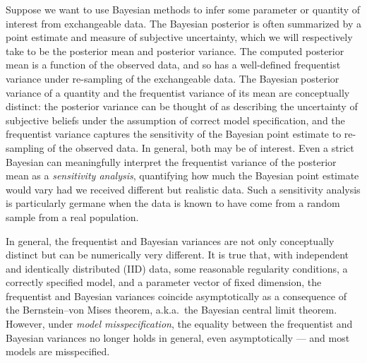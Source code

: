 
Suppose we want to use Bayesian methods to infer some parameter or quantity of
interest from exchangeable data. The Bayesian posterior is often summarized by a
point estimate and measure of subjective uncertainty, which we will respectively
take to be the posterior mean and posterior variance.  The computed posterior
mean is a function of the observed data, and so has a well-defined frequentist
variance under re-sampling of the exchangeable data.  The Bayesian posterior
variance of a quantity and the frequentist variance of its mean are conceptually
distinct: the posterior variance can be thought of as describing the
uncertainty of subjective beliefs under the assumption of correct model
specification, and the frequentist variance captures the sensitivity of the
Bayesian point estimate to re-sampling of the observed data.  In general,
both may be of interest.
Even a strict Bayesian can meaningfully interpret the
frequentist variance of the posterior mean as a \emph{sensitivity analysis},
quantifying how much the Bayesian point estimate would vary had we received
different but realistic data.  Such a sensitivity analysis is particularly
germane when the data is known to have come from a random sample from a real
population. 


In general, the frequentist and Bayesian variances are not only conceptually
distinct but can be numerically very different.  It is true that, with
independent and identically distributed (IID) data, some reasonable regularity
conditions, a correctly specified model, and a parameter vector of fixed
dimension, the frequentist and Bayesian variances coincide asymptotically as a
consequence of the Bernstein--von Mises theorem, a.k.a.\ the Bayesian central limit
theorem.  However, under \emph{model misspecification}, the equality between the
frequentist and Bayesian variances no longer holds in general, even
asymptotically \citep{kleijn:2012:bvm} --- and most models are misspecified.


